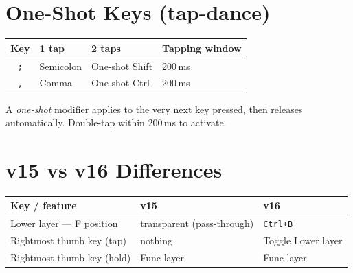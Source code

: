 \documentclass[11pt, letterpaper]{article}
\begin{document}
\section{One-Shot Keys (tap-dance)}

\begin{center}
\begin{tabular}{clll}
\toprule
\textbf{Key} & \textbf{1 tap} & \textbf{2 taps} & \textbf{Tapping window} \\
\midrule
\texttt{;} & Semicolon & One-shot Shift & 200\,ms \\
\texttt{,} & Comma     & One-shot Ctrl  & 200\,ms \\
\bottomrule
\end{tabular}
\end{center}

A \emph{one-shot} modifier applies to the very next key pressed, then
releases automatically. Double-tap within 200\,ms to activate.

\section{v15 vs v16 Differences}

\begin{tabular}{lll}
\toprule
\textbf{Key / feature}          & \textbf{v15}          & \textbf{v16} \\
\midrule
Lower layer — F position        & transparent (pass-through) & \texttt{Ctrl+B} \\
Rightmost thumb key (tap)       & nothing               & Toggle Lower layer \\
Rightmost thumb key (hold)      & Func layer            & Func layer \\
\bottomrule
\end{tabular}
\end{document}
